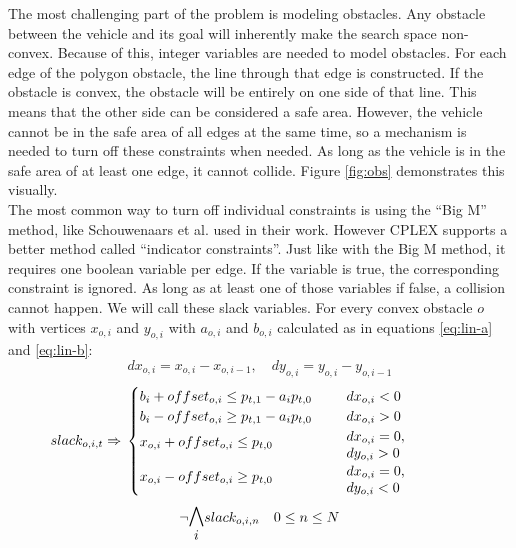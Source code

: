 The most challenging part of the problem is modeling obstacles. Any obstacle between the vehicle and its goal will inherently make the search space non-convex. Because of this, integer variables are needed to model obstacles. For each edge of the polygon obstacle, the line through that edge is constructed. If the obstacle is convex, the obstacle will be entirely on one side of that line. This means that the other side can be considered a safe area. However, the vehicle cannot be in the safe area of all edges at the same time, so a mechanism is needed to turn off these constraints when needed. As long as the vehicle is in the safe area of at least one edge, it cannot collide.  Figure \ref{fig:obs} demonstrates this visually. \\
The most common way to turn off individual constraints is using the ``Big M'' method, like Schouwenaars et al. \cite{Schouwenaars2001} used in their work. However CPLEX supports a better method called ``indicator constraints''. Just like with the Big M method, it requires one boolean variable per edge. If the variable is true, the corresponding constraint is ignored. As long as at least one of those variables if false, a collision cannot happen. We will call these slack variables. For every convex obstacle $o$ with vertices $x_{o,i}$ and $y_{o,i}$ with $a_{o,i}$ and $b_{o,i}$ calculated as in equations \ref{eq:lin-a} and \ref{eq:lin-b}:
\begin{equation*}
dx_{o,i} = x_{o,i} - x_{o,i-1}, \quad dy_{o,i} = y_{o,i} - y_{o,i-1}
\end{equation*}
\begin{equation}
\label{eq:obs}
slack_{o,i,t} \Rightarrow \\
\begin{cases}
b_i + offset_{o,i} \leq p_{t,1} - a_i p_{t,0} & dx_{o,i} < 0 \\
b_i - offset_{o,i}  \geq p_{t,1} - a_i p_{t,0} & dx_{o,i} > 0 \\
\parbox[t]{.4\columnwidth}{ \vspace{-0.25\baselineskip} $x_{o,i} + offset_{o,i}  \leq p_{t,0}$ } & \parbox[t]{.25\columnwidth}{ $dx_{o,i} = 0$, \\ $dy_{o,i} > 0$ } \\
\parbox[t]{.4\columnwidth}{ \vspace{-0.25\baselineskip} $x_{o,i} - offset_{o,i}  \geq p_{t,0}$ } & \parbox[t]{.25\columnwidth}{ $dx_{o,i} = 0$, \\ $dy_{o,i} < 0$ } \\

\end{cases}
\end{equation}
\begin{equation}
\neg \mathlarger{\mathlarger{\bigwedge_{i}}} slack_{o,i,n} \quad 0 \leq n \leq N
\end{equation}

